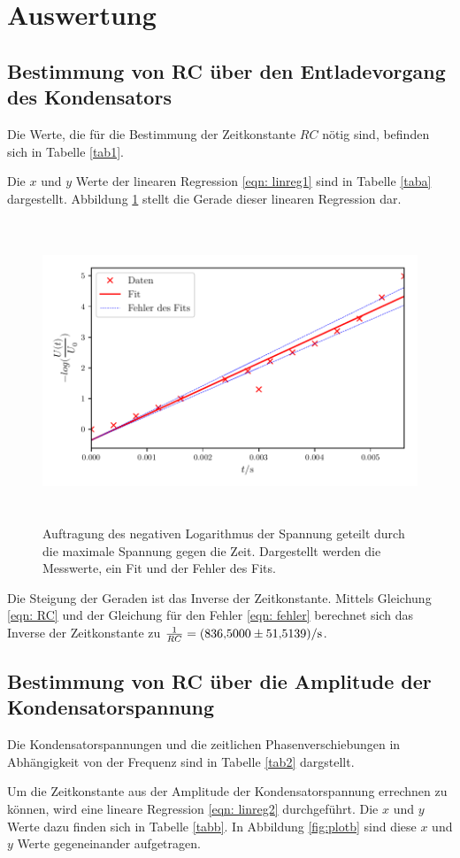 \section{Auswertung}
\label{sec:Auswertung}


\subsection{Bestimmung von RC über den Entladevorgang des Kondensators}
\label{sec: a}
Die Werte, die für die Bestimmung der Zeitkonstante $RC$ nötig sind, befinden sich in Tabelle \ref{tab1}. %

Die $x$ und $y$ Werte der linearen Regression \eqref{eqn: linreg1} sind in Tabelle \ref{taba} dargestellt.
Abbildung \ref{fig:plota} stellt die Gerade dieser linearen Regression dar.

\begin{figure}
  \centering
  \includegraphics[width=13cm, height=9cm]{build/plota.pdf}
  \caption{Auftragung des negativen Logarithmus der Spannung geteilt durch die maximale Spannung gegen die Zeit.
  Dargestellt werden die Messwerte, ein Fit und der Fehler des Fits.} %
  \label{fig:plota}
\end{figure}

\noindent Die Steigung der Geraden ist das Inverse der Zeitkonstante.
Mittels Gleichung \eqref{eqn: RC} und der Gleichung für den Fehler \eqref{eqn: fehler} berechnet
sich das Inverse der Zeitkonstante zu $\frac{1}{RC} = \SI{836.500 \pm 51.5139}{\per\second}$.

\subsection{Bestimmung von RC über die Amplitude der Kondensatorspannung}
\label{sec: b}
Die Kondensatorspannungen und die zeitlichen Phasenverschiebungen in Abhängigkeit
von der Frequenz sind in Tabelle \ref{tab2} dargstellt.

Um die Zeitkonstante aus der Amplitude der Kondensatorspannung errechnen zu können, wird eine lineare Regression 
\eqref{eqn: linreg2} durchgeführt. Die $x$ und $y$ Werte dazu finden sich in Tabelle \ref{tabb}.
In Abbildung \ref{fig:plotb} sind diese $x$ und $y$ Werte gegeneinander aufgetragen.



